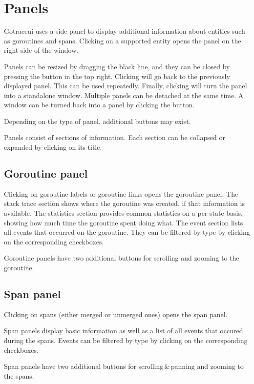 \documentclass[10pt,letterpaper,oneside,openany,english]{memoir}
\begin{document}
\section{Panels}\label{panels}

Gotraceui uses a side panel to display additional information about entities such as goroutines and spans.
Clicking on a supported entity opens the panel on the right side of the window.

Panels can be resized by dragging the black line, and they can be closed by pressing the  button in the top right.
Clicking  will go back to the previously displayed panel. This can be used repeatedly.
Finally, clicking  will turn the panel into a standalone window.
Multiple panels can be detached at the same time.
A window can be turned back into a panel by clicking the  button.

Depending on the type of panel, additional buttons may exist. 

Panels consist of sections of information.
Each section can be collapsed or expanded by clicking on its title.

\subsection{Goroutine panel}

Clicking on goroutine labels or goroutine links opens the goroutine panel.
The stack trace section shows where the goroutine was created, if that information is available.
The statistics section provides common statistics on a per-state basis, showing how much time the goroutine spent doing what.
The event section lists all events that occurred on the goroutine.
They can be filtered by type by clicking on the corresponding checkboxes.

Goroutine panels have two additional buttons for scrolling and zooming to the goroutine.

\subsection{Span panel}

Clicking on spans (either merged or unmerged ones) opens the span panel.

Span panels display basic information as well as a list of all events that occured during the spans.
Events can be filtered by type by clicking on the corresponding checkboxes.

Span panels have two additional buttons for scrolling\,\&\,panning and zooming to the spans.
\end{document}
